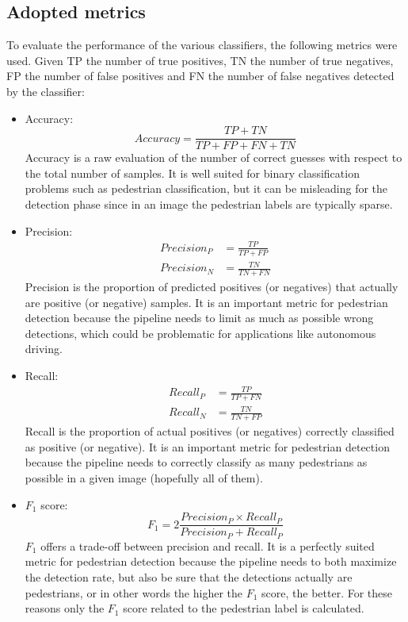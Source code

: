 \documentclass[journal,twocolumn]{IEEEtran}
\begin{document}
\subsection{Adopted metrics}

To evaluate the performance of the various classifiers, the following metrics were used. Given TP the number of true positives, TN the number of true negatives, FP the number of false positives and FN the number of false negatives detected by the classifier:

\begin{itemize}
\item Accuracy:
\begin{equation*}
Accuracy=\frac{TP+TN}{TP+FP+FN+TN}
\end{equation*}
Accuracy is a raw evaluation of the number of correct guesses with respect to the total number of samples. It is well suited for binary classification problems such as pedestrian classification, but it can be misleading for the detection phase since in an image the pedestrian labels are typically sparse.
\item Precision:
\begin{align*}
Precision_P &= \frac{TP}{TP+FP}\\
Precision_N &= \frac{TN}{TN+FN}
\end{align*}
Precision is the proportion of predicted positives (or negatives) that actually are positive (or negative) samples. It is an important metric for pedestrian detection because the pipeline needs to limit as much as possible wrong detections, which could be problematic for applications like autonomous driving.
\item Recall:
\begin{align*}
Recall_P &= \frac{TP}{TP+FN}\\
Recall_N &= \frac{TN}{TN+FP}
\end{align*}
Recall is the proportion of actual positives (or negatives) correctly classified as positive (or negative). It is an important metric for pedestrian detection because the pipeline needs to correctly classify as many pedestrians as possible in a given image (hopefully all of them).
\item $F_1$ score:
\begin{equation*}
F_1=2\frac{Precision_P\times Recall_P}{Precision_P + Recall_P}
\end{equation*}
$F_1$ offers a trade-off between precision and recall. It is a perfectly suited metric for pedestrian detection because the pipeline needs to both maximize the detection rate, but also be sure that the detections actually are pedestrians, or in other words the higher the $F_1$ score, the better. For these reasons only the $F_1$ score related to the pedestrian label is calculated.
\end{itemize}
\end{document}

